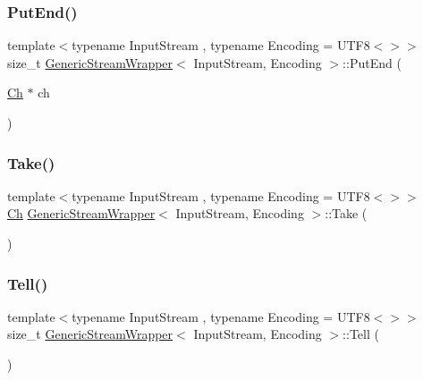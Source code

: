 \subsubsection{\texorpdfstring{Put\+End()}{PutEnd()}}
{\footnotesize\ttfamily template$<$typename Input\+Stream , typename Encoding  = U\+T\+F8$<$$>$$>$ \\
size\+\_\+t \hyperlink{classGenericStreamWrapper}{Generic\+Stream\+Wrapper}$<$ Input\+Stream, Encoding $>$\+::Put\+End (\begin{DoxyParamCaption}\item[{\hyperlink{classGenericStreamWrapper_aef9e89bc4997497315bde1b60e8bb848}{Ch} $\ast$}]{ch }\end{DoxyParamCaption})\hspace{0.3cm}{\ttfamily [inline]}}

\mbox{\label{classGenericStreamWrapper_a1c0bc67a233e08ed89b4ff37455e7754}} 
\subsubsection{\texorpdfstring{Take()}{Take()}}
{\footnotesize\ttfamily template$<$typename Input\+Stream , typename Encoding  = U\+T\+F8$<$$>$$>$ \\
\hyperlink{classGenericStreamWrapper_aef9e89bc4997497315bde1b60e8bb848}{Ch} \hyperlink{classGenericStreamWrapper}{Generic\+Stream\+Wrapper}$<$ Input\+Stream, Encoding $>$\+::Take (\begin{DoxyParamCaption}{ }\end{DoxyParamCaption})\hspace{0.3cm}{\ttfamily [inline]}}

\mbox{\label{classGenericStreamWrapper_a5068a627e0a2deffa985db39f89c5378}} 
\subsubsection{\texorpdfstring{Tell()}{Tell()}}
{\footnotesize\ttfamily template$<$typename Input\+Stream , typename Encoding  = U\+T\+F8$<$$>$$>$ \\
size\+\_\+t \hyperlink{classGenericStreamWrapper}{Generic\+Stream\+Wrapper}$<$ Input\+Stream, Encoding $>$\+::Tell (\begin{DoxyParamCaption}{ }\end{DoxyParamCaption})\hspace{0.3cm}{\ttfamily [inline]}}



